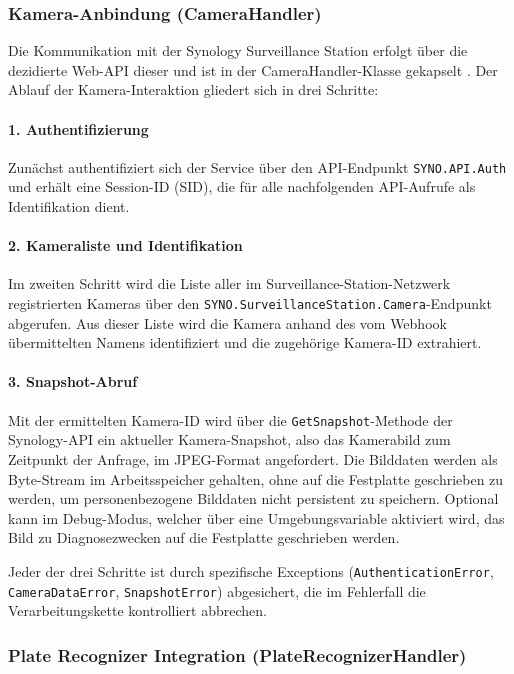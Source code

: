 \subsubsection{Kamera-Anbindung (CameraHandler)}

Die Kommunikation mit der Synology Surveillance Station erfolgt über die dezidierte Web-API dieser und ist in der CameraHandler-Klasse gekapselt \cite{synology_api}.
Der Ablauf der Kamera-Interaktion gliedert sich in drei Schritte:

\paragraph{1. Authentifizierung}
Zunächst authentifiziert sich der Service über den API-Endpunkt \texttt{SYNO.API.Auth} und erhält eine Session-ID (SID), die für alle nachfolgenden API-Aufrufe als Identifikation dient.

\paragraph{2. Kameraliste und Identifikation}
Im zweiten Schritt wird die Liste aller im Surveillance-Station-Netzwerk registrierten Kameras über den \texttt{SYNO.SurveillanceStation.Camera}-Endpunkt abgerufen.
Aus dieser Liste wird die Kamera anhand des vom Webhook übermittelten Namens identifiziert und die zugehörige Kamera-ID extrahiert.

\paragraph{3. Snapshot-Abruf}
Mit der ermittelten Kamera-ID wird über die \texttt{GetSnapshot}-Methode der Synology-API ein aktueller Kamera-Snapshot, also das Kamerabild zum Zeitpunkt der Anfrage, im JPEG-Format angefordert.
Die Bilddaten werden als Byte-Stream im Arbeitsspeicher gehalten, ohne auf die Festplatte geschrieben zu werden, um personenbezogene Bilddaten nicht persistent zu speichern.
Optional kann im Debug-Modus, welcher über eine Umgebungsvariable aktiviert wird, das Bild zu Diagnosezwecken auf die Festplatte geschrieben werden.

Jeder der drei Schritte ist durch spezifische Exceptions (\texttt{AuthenticationError}, \\ \texttt{CameraDataError}, \texttt{SnapshotError}) abgesichert, die im Fehlerfall die Verarbeitungskette kontrolliert abbrechen.


\subsubsection{Plate Recognizer Integration (PlateRecognizerHandler)}

